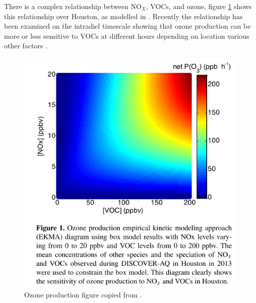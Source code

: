     There is a complex relationship between NO$_X$, VOCs, and ozone, figure \ref{LR:fig:NOXVOCOzone} shows this relationship over Houston, as modelled in \cite{Mazzuca2016}.
    Recently the relationship has been examined on the intradiel timescale showing that ozone production can be more or less sensitive to VOCs at different hours depending on location various other factors \citep{Mazzuca2016}.
    
    \begin{figure}
      \includegraphics[width=.75\textwidth]{Figures/Mazzuca2016_NOxVOCOzone.png}
      \caption{Ozone production figure copied from \citet{Mazzuca2016}.}
      \label{LR:fig:NOXVOCOzone}
    \end{figure}
  
    
